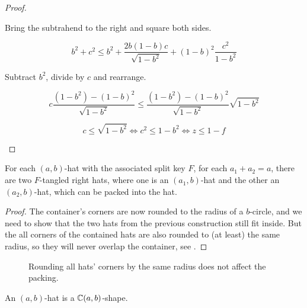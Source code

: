 \documentclass[%
    a4paper,              %
    style=screen,          %
    bibliography=totoc,   %
    nexus,                %
    lnum,                 %
    extramargin,          %
]{tubsbook}
\begin{document}
\begin{proof}
\begin{itemize}
            Bring the subtrahend to the right and square both sides.

            $$b^2+c^2 \le b^2 + \frac{2b(1-b)c}{\sqrt{1-b^2}} + (1-b)^2\frac{c^2}{1-b^2}$$

            Subtract $b^2$, divide by $c$ and rearrange.

            $$c\frac{(1-b^2)-(1-b)^2}{\sqrt{1-b^2}} \le \frac{(1-b^2)-(1-b)^2}{\sqrt{1-b^2}}\sqrt{1-b^2}$$

            $$c \le \sqrt{1-b^2} \iff c^2 \le 1-b^2 \iff z \le 1-f$$
    \end{itemize}
\end{proof}

\begin{theorem}\label{th:roundedhatsinhat}
    For each $(a,b)$-hat with the associated split key $F$,
    for each $a_1 + a_2 = a$, there are two $F$-tangled right hats, where one is an $(a_1,b)$-hat and the other an $(a_2,b)$-hat, which can be packed into the hat.
\end{theorem}

\begin{proof}
    The container's corners are now rounded to the radius of a $b$-circle, and we need to show that the two hats from the previous construction still fit inside. But the all corners of the contained hats are also rounded to (at least) the same radius, so they will never overlap the container, see .
\end{proof}

\begin{figure}[htbp!]
    \centering


    \caption{Rounding all hats' corners by the same radius does not affect the packing.}
    \label{fig:rounding-hats}
\end{figure}

\begin{theorem}
    An $(a,b)$-hat is a $\mathbb{C}(a,b)$-shape.
\end{theorem}
\end{document}
